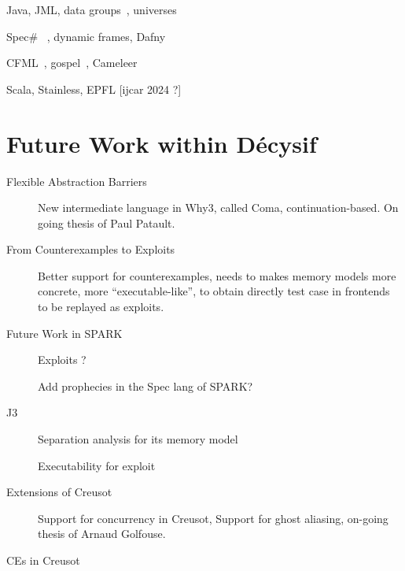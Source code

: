 \documentclass[a4paper,11pt]{article}
\begin{document}
Java, JML, data groups~\cite{breunesse03ftfjp}, universes~\cite{Dietl05jot}

Spec\# ~\cite{BarnettLS04}, dynamic frames, Dafny

CFML~\cite{chargueraud08icfp}, gospel~\cite{gospelfm19}, Cameleer~\cite{DBLP:conf/cav/PereiraR20}

Scala, Stainless, EPFL [ijcar 2024 ?]

\section{Future Work within Décysif}
\label{sec:future}



\begin{description}
\item[Flexible Abstraction Barriers]

  New intermediate language in Why3, called Coma, continuation-based. On going thesis of
  Paul Patault.

\item[From Counterexamples to Exploits]

  Better support for counterexamples, needs to makes memory models
  more concrete, more ``executable-like'', to obtain directly test
  case in frontends to be replayed as exploits.

\item[Future Work in SPARK]

  Exploits ?

  Add prophecies in the Spec lang of SPARK?

\item[J3]

  Separation analysis for its memory model

  Executability for exploit

\item[Extensions of Creusot]

  Support for concurrency in Creusot, Support for ghost aliasing, on-going
  thesis of Arnaud Golfouse.

\item[CEs in Creusot]

\end{description}



%

\end{document}
